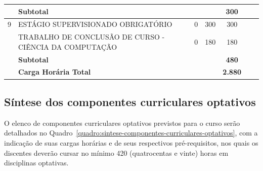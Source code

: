 \documentclass[
	12pt,				%
	openright,			%
  oneside,     %
	a4paper,			%
 hyphens,
	chapter=TITLE,		%
	english,			%
	french,				%
	spanish,			%
	brazil				%
	]{abntex2}
\begin{document}
\begin{center}
\begin{tiny}
\begin{longtable}{cp{4.5cm}cccp{2.8cm}p{2.8cm}}
        & \multicolumn{3}{l}{\textbf{Subtotal}} & \textbf{300} & & \\ \midrule
    9   
        & ESTÁGIO SUPERVISIONADO OBRIGATÓRIO & 0 & 300 & 300 & & \\ \cline{2-7}
        & TRABALHO DE CONCLUSÃO DE CURSO - CIÊNCIA DA COMPUTAÇÃO & 0 & 180 & 180 & & \\ \midrule
        & \multicolumn{3}{l}{\textbf{Subtotal}} & \textbf{480} & & \\ \midrule
        & \multicolumn{3}{l}{\textbf{Carga Horária Total}} & \textbf{2.880} & & \\
      \bottomrule
  \end{longtable}
  \end{tiny}      
  \end{center}
  
  \subsection{Síntese dos componentes curriculares optativos}
  
  O elenco de componentes curriculares optativos previstos para o curso serão detalhados no Quadro~\ref{quadro:sintese-componentes-curriculares-optativos}, com a indicação de suas cargas horárias e de seus respectivos pré-requisitos, nos quais os discentes deverão cursar no mínimo 420 (quatrocentas e vinte) horas em disciplinas optativas.
  
\end{document}
